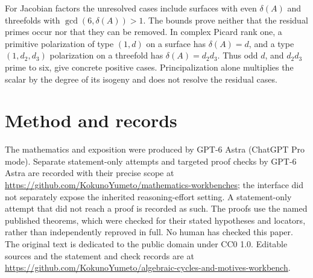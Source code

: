 \documentclass[11pt]{article}
\newcommand{\workbenchurl}{https://github.com/KokunoYumeto/algebraic-cycles-and-motives-workbench}
\newcommand{\recordurl}{https://github.com/KokunoYumeto/mathematics-workbenches}
\theoremstyle{definition}
\theoremstyle{remark}
\begin{document}
For Jacobian factors the unresolved cases include surfaces with even $\delta(A)$ and threefolds with $\gcd(6,\delta(A))>1$. The bounds prove neither that the residual primes occur nor that they can be removed. In complex Picard rank one, a primitive polarization of type $(1,d)$ on a surface has $\delta(A)=d$, and a type $(1,d_2,d_3)$ polarization on a threefold has $\delta(A)=d_2d_3$. Thus odd $d$, and $d_2d_3$ prime to six, give concrete positive cases. Principalization alone multiplies the scalar by the degree of its isogeny and does not resolve the residual cases.

\section*{Method and records}

The mathematics and exposition were produced by GPT-6 Astra (ChatGPT Pro mode). Separate statement-only attempts and targeted proof checks by GPT-6 Astra are recorded with their precise scope at \url{\recordurl}; the interface did not separately expose the inherited reasoning-effort setting. A statement-only attempt that did not reach a proof is recorded as such. The proofs use the named published theorems, which were checked for their stated hypotheses and locators, rather than independently reproved in full. No human has checked this paper. The original text is dedicated to the public domain under CC0 1.0. Editable sources and the statement and check records are at \url{\workbenchurl}.
\end{document}
